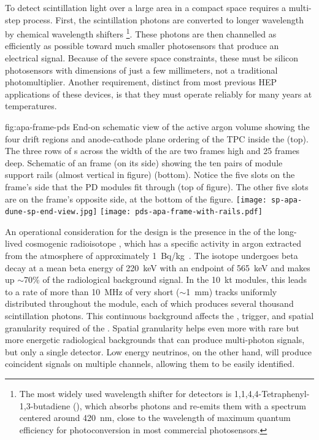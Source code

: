 To detect scintillation light over a large area in a compact space requires a multi-step process.  First, the  scintillation photons are converted to longer wavelength by chemical wavelength shifters
\footnote{The most widely used wavelength shifter for \lar detectors is  1,1,4,4-Tetraphenyl-1,3-butadiene (), 
which absorbs  photons and re-emits them with a spectrum centered around \SI{420}{nm}, close to the wavelength of maximum quantum efficiency for photoconversion in most commercial photosensors.}.
These photons are then channelled as efficiently as possible toward much smaller photosensors that produce an electrical signal. Because of the severe space constraints, these must be silicon photosensors with dimensions of just a few millimeters,  not a traditional photomultiplier.
Another requirement, distinct from most previous HEP applications of these devices, is that they must operate reliably for many years at \lar temperatures. 

\begin{dunefigure}{fig:apa-frame-pds}
{End-on schematic view of the active argon volume showing the four drift regions and anode-cathode plane ordering of the TPC inside the  (top). The three rows of s across the width of the  are two frames high and 25 frames deep. Schematic of an  frame (on its side) showing the ten pairs of  module support rails (almost vertical in figure) (bottom). Notice the five slots on the frame's side that the PD modules fit through (top of figure). The other five slots are on the frame's opposite side, at the bottom of the figure.}
\texttt{[image: sp-apa-dune-sp-end-view.jpg]}
\texttt{[image: pds-apa-frame-with-rails.pdf]}
\end{dunefigure}

An operational consideration for the  design is the presence in the \lartpc of the long-lived cosmogenic radioisotope , which has a specific activity in argon extracted from the atmosphere of approximately \SI{1}{Bq/kg}~\cite{bkds}. The isotope undergoes beta decay at a mean beta energy of \SI{220}{keV} with an endpoint of \SI{565}{keV} and makes up $\sim$70\% of the radiological background signal.
In the \SI{10}{kt}  modules, this leads to a rate of more than \SI{10}{MHz} of very short ($\sim$\SI{1}{mm}) tracks uniformly distributed throughout the module, each of which produces several thousand  scintillation photons. This continuous background affects the , trigger, and spatial granularity required of the . Spatial granularity helps even more with rare but more energetic radiological backgrounds that can produce multi-photon signals, but only a single detector. Low energy neutrinos, on the other hand, will produce coincident  signals on multiple channels, allowing them to be easily identified.

